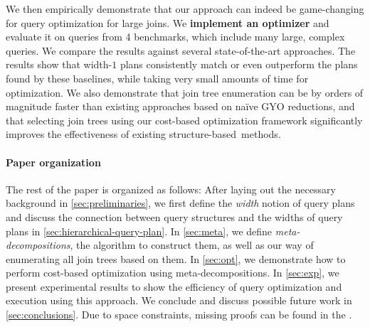 We then empirically demonstrate that our approach can indeed be game-changing for query optimization for large joins. %
We \textbf{implement an optimizer \sys{}} and evaluate it on queries from 4 benchmarks, which include many large, complex queries.  We compare the results against several state-of-the-art approaches. The results show that width-$1$ plans consistently match or even outperform the plans found by these baselines, while taking very small amounts of time for optimization.
We also demonstrate that join tree enumeration can be by orders of magnitude faster than existing approaches based on na\"ive GYO reductions, and that selecting join trees using our cost-based optimization framework significantly improves the effectiveness of existing structure-based~methods.

\paragraph{Paper organization} The rest of the paper is organized as follows:
After laying out the necessary background in \cref{sec:preliminaries}, we first define the \emph{width} notion of query plans and discuss the connection between query structures and the widths of query plans in \cref{sec:hierarchical-query-plan}.
In \cref{sec:meta}, we define \emph{meta-decompositions}, the algorithm to construct them, as well as our way of enumerating all join trees based on them.
In \cref{sec:opt}, we demonstrate how to perform cost-based optimization using meta-decompositions.
In \cref{sec:exp}, we present experimental results to show the efficiency of query optimization and execution using this approach.
We conclude and discuss possible future work in \cref{sec:conclusions}.  
Due to space constraints, missing proofs can be found in the \arxivorappendix.
